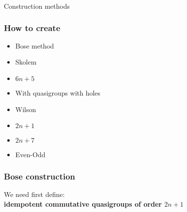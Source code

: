 \begin{frame}[plain,c]
\begin{center}
	\huge Construction methods
\end{center}
\end{frame}

\begin{frame}
	\frametitle{How to create}
	\begin{itemize}
		\item Bose method
		\item Skolem
		\item $6n + 5$
		\item With quasigroups with holes
		\item Wilson
		\item $2n +1$
		\item $2n +7$
		\item Even-Odd
	\end{itemize}
\end{frame}

\begin{frame}
	\frametitle{Bose construction}
	We need first define:\\
	\textbf{idempotent commutative quasigroups of order $2n + 1$}
\end{frame}

